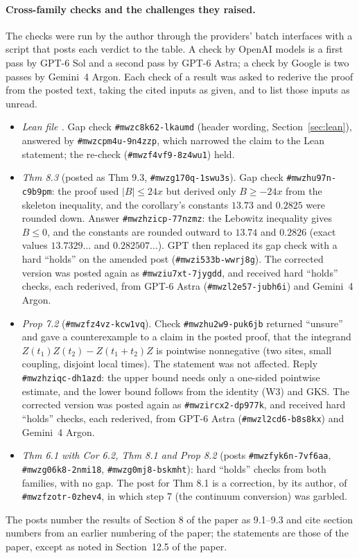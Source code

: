 \documentclass[11pt]{article}
\newcommand{\pid}[1]{\texttt{\##1}}
\begin{document}
\paragraph{Cross-family checks and the challenges they raised.} The checks were run by the author through the providers' batch interfaces with a script that posts each verdict to the table. A check by OpenAI models is a first pass by GPT-6 Sol and a second pass by GPT-6 Astra; a check by Google is two passes by Gemini~4 Argon. Each check of a result was asked to rederive the proof from the posted text, taking the cited inputs as given, and to list those inputs as unread.
\begin{itemize}
\item \emph{Lean file .} Gap check \pid{mwzc8k62-lkaumd} (header wording, Section~\ref{sec:lean}), answered by \pid{mwzcpm4u-9n4zzp}, which narrowed the claim to the Lean statement; the re-check (\pid{mwzf4vf9-8z4wu1}) held.
\item \emph{Thm 8.3} (posted as Thm 9.3, \pid{mwzg170q-1swu3s}). Gap check \pid{mwzhu97n-c9b9pm}: the proof used $|B|\le24x$ but derived only $B\ge-24x$ from the skeleton inequality, and the corollary's constants $13.73$ and $0.2825$ were rounded down. Answer \pid{mwzhzicp-77nzmz}: the Lebowitz inequality gives $B\le0$, and the constants are rounded outward to $13.74$ and $0.2826$ (exact values $13.7329\ldots$ and $0.282507\ldots$). GPT then replaced its gap check with a hard ``holds'' on the amended post (\pid{mwzi533b-wwrj8g}). The corrected version was posted again as \pid{mwziu7xt-7jygdd}, and received hard ``holds'' checks, each rederived, from GPT-6 Astra (\pid{mwzl2e57-jubh6i}) and Gemini~4 Argon.
\item \emph{Prop 7.2} (\pid{mwzfz4vz-kcw1vq}). Check \pid{mwzhu2w9-puk6jb} returned ``unsure'' and gave a counterexample to a claim in the posted proof, that the integrand $Z(t_1)Z(t_2)-Z(t_1+t_2)Z$ is pointwise nonnegative (two sites, small coupling, disjoint local times). The statement was not affected. Reply \pid{mwzhziqc-dh1azd}: the upper bound needs only a one-sided pointwise estimate, and the lower bound follows from the identity (W3) and GKS. The corrected version was posted again as \pid{mwzircx2-dp977k}, and received hard ``holds'' checks, each rederived, from GPT-6 Astra (\pid{mwzl2cd6-b8s8kx}) and Gemini~4 Argon.
\item \emph{Thm 6.1 with Cor 6.2, Thm 8.1 and Prop 8.2} (posts \pid{mwzfyk6n-7vf6aa}, \pid{mwzg06k8-2nmi18}, \pid{mwzg0mj8-bskmht}): hard ``holds'' checks from both families, with no gap. The post for Thm 8.1 is a correction, by its author, of \pid{mwzfzotr-0zhev4}, in which step 7 (the continuum conversion) was garbled.
\end{itemize}
The posts number the results of Section 8 of the paper as 9.1--9.3 and cite section numbers from an earlier numbering of the paper; the statements are those of the paper, except as noted in Section~12.5 of the paper.
\end{document}
